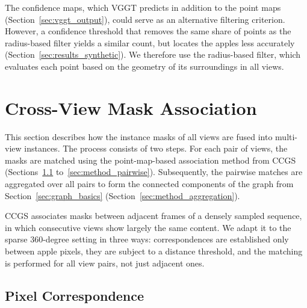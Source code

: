 \documentclass[english, egger, bsc]{vcethesis}
\begin{document}
The confidence maps, which VGGT predicts in addition to the point maps (Section~\ref{sec:vggt_output}), could serve as an alternative filtering criterion. However, a confidence threshold that removes the same share of points as the radius-based filter yields a similar count, but locates the apples less accurately (Section~\ref{sec:results_synthetic}). We therefore use the radius-based filter, which evaluates each point based on the geometry of its surroundings in all views.

\section{Cross-View Mask Association}
\label{sec:method_association}
This section describes how the instance masks of all views are fused into multi-view instances. The process consists of two steps. For each pair of views, the masks are matched using the point-map-based association method from CCGS
\cite{hu2026ccgs} (Sections~\ref{sec:method_correspondence} to~\ref{sec:method_pairwise}). Subsequently, the pairwise matches are aggregated over all pairs to form the connected components of the graph from Section~\ref{sec:graph_basics} (Section~\ref{sec:method_aggregation}).

CCGS associates masks between adjacent frames of a densely sampled sequence, in which consecutive views show largely the same content. We adapt it to the sparse 360-degree setting in three ways: correspondences are established only between apple pixels, they are subject to a distance threshold, and the matching is performed for all view pairs, not just adjacent ones.


\subsection{Pixel Correspondence}
\label{sec:method_correspondence}
\end{document}

